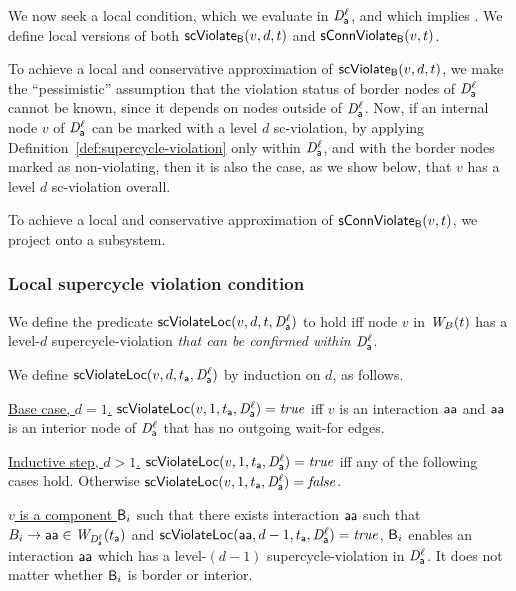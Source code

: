 
We now seek a local condition, which we evaluate in $\mathit{D}_{\mathsf{a}}^{\ell}$, and which implies \GAO.
We define local versions of both $\mathsf{scViolate}_{\mathsf{B}}(v,d,t)$ and $\mathsf{sConnViolate}_{\mathsf{B}}(v,t)$.

To achieve a local and conservative approximation of $\mathsf{scViolate}_{\mathsf{B}}(v,d,t)$, we make the ``pessimistic'' assumption that the violation status of border
nodes of $\mathit{D}_{\mathsf{a}}^{\ell}$ cannot be known, since it depends on nodes outside of $\mathit{D}_{\mathsf{a}}^{\ell}$.
Now, if an internal node $v$ of $\mathit{D}_{\mathsf{a}}^{\ell}$ can be marked with a level $d$ sc-violation, by applying 
Definition~\ref{def:supercycle-violation} only within
$\mathit{D}_{\mathsf{a}}^{\ell}$, and with the border nodes marked as non-violating,
then it is also the case, as we show below, that $v$ has a level $d$ sc-violation overall.

To achieve a local and conservative approximation of
$\mathsf{sConnViolate}_{\mathsf{B}}(v,t)$, we project onto a subsystem.




\subsubsection{Local supercycle violation condition}

We define the predicate $\mathsf{scViolateLoc}(v,d,t,\mathit{D}_{\mathsf{a}}^{\ell})$ to hold iff node $v$ in $\mathit{W}_{B}({t})$ has a level-$d$ supercycle-violation
\emph{that can be confirmed within $\mathit{D}_{\mathsf{a}}^{\ell}$}.

\label{def:supercycle.violation.local}
We define $\mathsf{scViolateLoc}(v,d,t_{\mathsf{a}},\mathit{D}_{\mathsf{a}}^{\ell})$ by induction on $d$, as follows.

\noindent
\ul{Base case, $d=1$.} $\mathsf{scViolateLoc}(v,1,t_{\mathsf{a}},\mathit{D}_{\mathsf{a}}^{\ell}) = \mathit{true}$  iff
$v$ is an interaction $\mathsf{aa}$ and 
$\mathsf{aa}$ is an interior node of $\mathit{D}_{\mathsf{a}}^{\ell}$ that has no outgoing wait-for edges.


\noindent
\ul{Inductive step, $d > 1$.} $\mathsf{scViolateLoc}(v,1,t_{\mathsf{a}},\mathit{D}_{\mathsf{a}}^{\ell}) = \mathit{true}$ iff any of the following cases hold. Otherwise 
$\mathsf{scViolateLoc}(v,1,t_{\mathsf{a}},\mathit{D}_{\mathsf{a}}^{\ell}) = \mathit{false}$.

\be

\item \ul{$v$ is a component $\mathsf{B}_i$} such that there exists interaction $\mathsf{aa}$ such that $B_i \rightarrow \mathsf{aa} \in \mathit{W}_{\mathit{D}_{\mathsf{a}}^{\ell}}({t_{\mathsf{a}}})$ and $\mathsf{scViolateLoc}(\mathsf{aa},d-1,t_{\mathsf{a}},\mathit{D}_{\mathsf{a}}^{\ell}) = \mathit{true}$,
         \ie $\mathsf{B}_i$ enables an interaction $\mathsf{aa}$ which has a level-$(d-1)$ supercycle-violation in $\mathit{D}_{\mathsf{a}}^{\ell}$. 
It does not matter whether $\mathsf{B}_i$ is border or interior.


